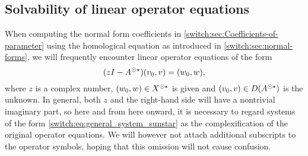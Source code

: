\subsection{Solvability of linear operator equations} \label{switch:sec:solvability}
When computing the normal form coefficients in \cref{switch:sec:Coefficients-of-parameter} using the homological equation as introduced in \cref{switch:sec:normal-forms}, we will frequently encounter linear operator equations of the form
\begin{equation}
  \label{switch:eq:general_system_sunstar}
  (z I-A^{\odot\star})(v_0,v) = (w_0,w),
\end{equation}
where $z$ is a complex number, $(w_0,w) \in X^{\odot\star}$ is given and $(v_0,v) \in D(A^{\odot\star})$ is the unknown. In general, both $z$ and the right-hand side will have a nontrivial imaginary part, so here and from here onward, it is necessary to regard systems of the form \cref{switch:eq:general_system_sunstar} as the complexification of the original operator equations. We will however not attach additional subscripts to the operator symbols, hoping that this omission will not cause confusion.

